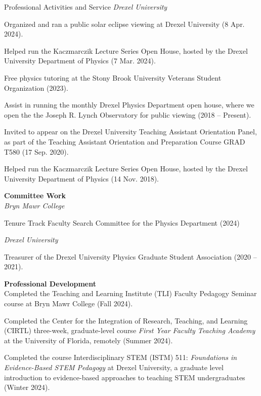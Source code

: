 \documentclass{resume} %
\begin{document}
\begin{rSection}{Professional Activities and Service}
\textit{Drexel University}
\begin{description}[leftmargin=2em, style=nextline]
\vspace{-0.5em}
\item[~] Organized and ran a public solar eclipse viewing at Drexel University (8 Apr. 2024).
\item[~]Helped run the Kaczmarczik Lecture Series Open House, hosted by the Drexel University Department of Physics (7 Mar. 2024).
\item[~]Free physics tutoring at the Stony Brook University Veterans Student Organization (2023).
\item[~]Assist in running the monthly Drexel Physics Department open house, where we open the the Joseph R. Lynch Observatory for public viewing (2018 -- Present).
\item[~]Invited to appear on the Drexel University Teaching Assistant Orientation Panel, as part of the Teaching Assistant Orientation and Preparation Course GRAD T580 (17 Sep. 2020).
\item[~]Helped run the Kaczmarczik Lecture Series Open House, hosted by the Drexel University Department of Physics (14 Nov. 2018).
\end{description}

\textbf{Committee Work}\\
\textit{Bryn Mawr College}
\begin{description}[leftmargin=2em, style=nextline]
\vspace{-0.5em}
\item[~] Tenure Track Faculty Search Committee for the Physics Department (2024)
\end{description}

\textit{Drexel University}
\begin{description}[leftmargin=2em, style=nextline]
\vspace{-0.5em}
\item[~] Treasurer of the Drexel University Physics Graduate Student Association (2020 -- 2021).
\end{description}

\textbf{Professional Development}\\
Completed the Teaching and Learning Institute (TLI) Faculty Pedagogy Seminar course at Bryn Mawr College (Fall 2024).

Completed the Center for the Integration of Research, Teaching, and Learning (CIRTL) three-week, graduate-level course \textit{First Year Faculty Teaching Academy} at the University of Florida, remotely (Summer 2024).

Completed the course Interdisciplinary STEM (ISTM) 511: \textit{Foundations in Evidence-Based STEM Pedagogy} at Drexel University, a graduate level introduction to evidence-based approaches to teaching STEM undergraduates (Winter 2024).

\end{rSection}
\end{document}
